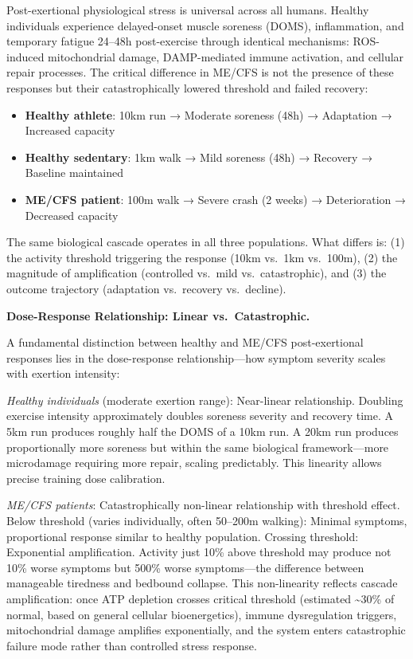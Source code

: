 Post-exertional physiological stress is universal across all humans. Healthy individuals experience delayed-onset muscle soreness (DOMS), inflammation, and temporary fatigue 24--48h post-exercise through identical mechanisms: ROS-induced mitochondrial damage, DAMP-mediated immune activation, and cellular repair processes. The critical difference in ME/CFS is not the presence of these responses but their catastrophically lowered threshold and failed recovery:

\begin{itemize}
    \item \textbf{Healthy athlete}: 10km run → Moderate soreness (48h) → Adaptation → Increased capacity
    \item \textbf{Healthy sedentary}: 1km walk → Mild soreness (48h) → Recovery → Baseline maintained
    \item \textbf{ME/CFS patient}: 100m walk → Severe crash (2 weeks) → Deterioration → Decreased capacity
\end{itemize}

The same biological cascade operates in all three populations. What differs is: (1) the activity threshold triggering the response (10km vs.\ 1km vs.\ 100m), (2) the magnitude of amplification (controlled vs.\ mild vs.\ catastrophic), and (3) the outcome trajectory (adaptation vs.\ recovery vs.\ decline).

\textbf{Dose-Response Relationship: Linear vs.\ Catastrophic.}

A fundamental distinction between healthy and ME/CFS post-exertional responses lies in the dose-response relationship---how symptom severity scales with exertion intensity:

\textit{Healthy individuals} (moderate exertion range): Near-linear relationship. Doubling exercise intensity approximately doubles soreness severity and recovery time. A 5km run produces roughly half the DOMS of a 10km run. A 20km run produces proportionally more soreness but within the same biological framework---more microdamage requiring more repair, scaling predictably. This linearity allows precise training dose calibration.

\textit{ME/CFS patients}: Catastrophically non-linear relationship with threshold effect. Below threshold (varies individually, often 50--200m walking): Minimal symptoms, proportional response similar to healthy population. Crossing threshold: Exponential amplification. Activity just 10\% above threshold may produce not 10\% worse symptoms but 500\% worse symptoms---the difference between manageable tiredness and bedbound collapse. This non-linearity reflects cascade amplification: once ATP depletion crosses critical threshold (estimated \textasciitilde30\% of normal, based on general cellular bioenergetics), immune dysregulation triggers, mitochondrial damage amplifies exponentially, and the system enters catastrophic failure mode rather than controlled stress response.

